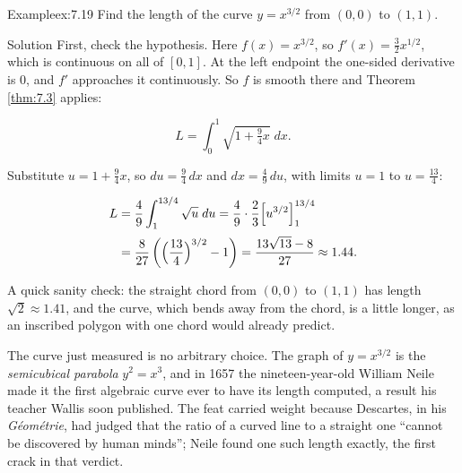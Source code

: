 \documentclass[a4paper,12pt,oneside]{memoir}
\begin{document}
\begin{workedexample}
\begin{envexample}{Example}{ex:7.19}{}
Find the length of the curve \(y = x^{3/2}\) from \((0, 0)\) to \((1, 1)\).
\end{envexample}
\begin{envsolution}{Solution}{}{}
First, check the hypothesis. Here \(f(x) = x^{3/2}\), so \(f'(x) = \tfrac{3}{2}x^{1/2}\), which is continuous on all of \([0, 1]\). At the left endpoint the one-sided derivative is \(0\), and \(f'\) approaches it continuously. So \(f\) is smooth there and Theorem \ref{thm:7.3} applies:

\[ L = \int_{0}^{1} \sqrt{1 + \tfrac{9}{4}x}\;dx. \]

Substitute \(u = 1 + \tfrac{9}{4}x\), so \(du = \tfrac{9}{4}\,dx\) and \(dx = \tfrac{4}{9}\,du\), with limits \(u = 1\) to \(u = \tfrac{13}{4}\):

\[ \begin{aligned}
          L &= \frac{4}{9}\int_{1}^{13/4} \sqrt{u}\;du = \frac{4}{9}\cdot\frac{2}{3}\Bigl[u^{3/2}\Bigr]_{1}^{13/4} \\[2pt]
            &= \frac{8}{27}\left(\Bigl(\frac{13}{4}\Bigr)^{3/2} - 1\right) = \frac{13\sqrt{13} - 8}{27} \approx 1.44.
        \end{aligned} \]

A quick sanity check: the straight chord from \((0,0)\) to \((1,1)\) has length \(\sqrt{2} \approx 1.41\), and the curve, which bends away from the chord, is a little longer, as an inscribed polygon with one chord would already predict. \qedmark
\end{envsolution}
\end{workedexample}
The curve just measured is no arbitrary choice. The graph of \(y = x^{3/2}\) is the \emph{semicubical parabola} \(y^{2} = x^{3}\), and in 1657 the nineteen-year-old William Neile made it the first algebraic curve ever to have its length computed, a result his teacher Wallis soon published. The feat carried weight because Descartes, in his \emph{Géométrie}, had judged that the ratio of a curved line to a straight one “cannot be discovered by human minds”; Neile found one such length exactly, the first crack in that verdict.
\end{document}
